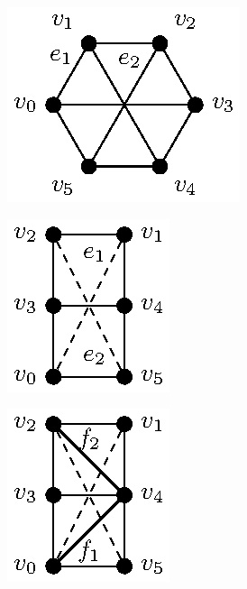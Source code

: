 \ClearMyMinHeight
{}

\begin{figure}\centering
    \begin{subfigure}{.2\linewidth}\centering
        \includegraphics[height=\myMinHeight]{img/epsfromtikz/omd_k33_example_new-0}
        \caption{}\label{fig:omd_k33_example:a}
    \end{subfigure}\hfill
    \begin{subfigure}{.15\linewidth}\centering
        \includegraphics[height=\myMinHeight]{img/epsfromtikz/omd_k33_example_new-1}
        \caption{}\label{fig:omd_k33_example:b}
    \end{subfigure}
    \begin{subfigure}{.15\linewidth}\centering
        \includegraphics[height=\myMinHeight]{img/epsfromtikz/omd_k33_example_new-2}

\end{subfigure}
\end{figure}
